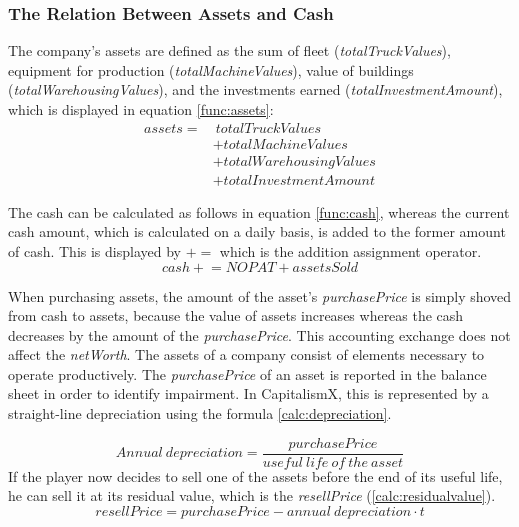 \subsubsection{The Relation Between Assets and Cash}

The company's assets are defined as the sum of fleet (\textit{totalTruckValues}), equipment for production (\textit{totalMachineValues}), value of buildings (\textit{totalWarehousingValues}), and the investments earned (\textit{totalInvestmentAmount}), which is displayed in equation \ref{func:assets}:
\begin{equation}
    \label{func:assets}
    \begin{aligned}
        assets = & ~totalTruckValues \\
        &+ totalMachineValues \\ 
        &+ totalWarehousingValues \\
        &+ totalInvestmentAmount
    \end{aligned}
\end{equation}

The cash can be calculated as follows in equation \ref{func:cash}, whereas the current cash amount, which is calculated on a daily basis, is added to the former amount of cash. This is displayed by $+=$ which is the addition assignment operator.
\begin{equation}
    \label{func:cash}
    cash \mathrel{+}= NOPAT + assetsSold 
\end{equation}

When purchasing assets, the amount of the asset's \textit{purchasePrice} is simply shoved from cash to assets, because the value of assets increases whereas the cash decreases by the amount of the \textit{purchasePrice}. This accounting exchange does not affect the \textit{netWorth}.
The assets of a company consist of elements necessary to operate productively. The \textit{purchasePrice} of an asset is reported in the balance sheet in order to identify impairment. In CapitalismX, this is represented by a straight-line depreciation using the formula \ref{calc:depreciation}. 
    
\begin{equation}
     \label{calc:depreciation}
     Annual \ depreciation = {\frac{purchasePrice}{useful \ life \ of \ the \ asset}}
\end{equation}
If the player now decides to sell one of the assets before the end of its useful life, he can sell it at its residual value, which is the \textit{resellPrice} (\ref{calc:residualvalue}). 
\begin{equation}
     \label{calc:residualvalue}
     resellPrice = {{purchasePrice} - {annual \ depreciation \cdot t }}
\end{equation}

